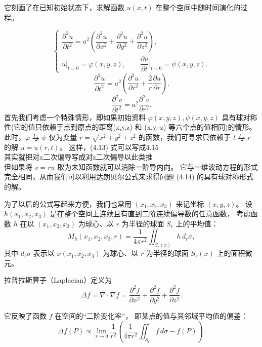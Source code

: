 \begin{solution}
\begin{definition}[柯西问题给t=0的初始时刻条件]
它刻画了在已知初始状态下，求解函数 $u(x,t)$ 在整个空间中随时间演化的过程。
\end{definition}
\begin{dxsolution} \begin{equation}
\begin{cases}
\dfrac{\partial^2 u}{\partial t^2} 
= a^2 \!\left(
\dfrac{\partial^2 u}{\partial x^2} 
+ \dfrac{\partial^2 u}{\partial y^2} 
+ \dfrac{\partial^2 u}{\partial z^2}
\right), \\[10pt]
u\big|_{t=0} = \varphi(x,y,z), \qquad
\dfrac{\partial u}{\partial t}\Big|_{t=0} = \psi(x,y,z).
\end{cases}
\tag{4.14}
\end{equation}
\begin{equation}
\dfrac{\partial^2 u}{\partial t^2}
= a^2 \!\left(
\dfrac{\partial^2 u}{\partial r^2}
+ \dfrac{2}{r} \dfrac{\partial u}{\partial r}
\right).
\tag{4.15}
\end{equation}
\[
\frac{\partial^2 v}{\partial t^2}
= a^2 \frac{\partial^2 v}{\partial r^2}.
\]
\tcblower
首先我们考虑一个特殊情形，即如果初始资料 
$\varphi(x,y,z), \psi(x,y,z)$ 
具有球对称性(它的值只依赖于点到原点的距离(x,y,z) 和 (x,y,-z) 等六个点的值相同)的情形。此时，$\varphi$ 与 $\psi$ 
仅为变量 
$r = \sqrt{x^2 + y^2 + z^2}$ 
的函数，我们可寻求只依赖于 $t$ 与 $r$ 的解 
$u = u(r,t)$。
这样，(4.13) 式可以写成4.15
\\其实就把对x二次偏导写成对z二次偏导以此类推\\
但如果将 $v = r u$ 取为未知函数就可以消除一阶导内向。
它与一维波动方程的形式完全相同，从而我们可以利用达朗贝尔公式来求得问题 (4.14) 的具有球对称形式的解。
\end{dxsolution}
为了以后的公式写起来方便，我们也常用 $(x_1, x_2, x_3)$ 来记坐标 $(x, y, z)$。  
设 $h(x_1, x_2, x_3)$ 是在整个空间上连续且有直到二阶连续偏导数的任意函数，  
考虑函数 $h$ 在以 $(x_1, x_2, x_3)$ 为球心、以 $r$ 为半径的球面 $S_r$ 上的平均值：
\[
M_h(x_1, x_2, x_3, r)
= \frac{1}{4\pi r^2} \iint_{S_r(x)} h\, d_r\sigma,
\tag{4.16}
\]
其中 $d_r\sigma$ 表示以 $x(x_1, x_2, x_3)$ 为球心、以 $r$ 为半径的球面 $S_r(x)$ 上的面积微元。

\begin{definition}
拉普拉斯算子（Laplacian）定义为
\[
\boxed{\Delta f = \nabla \cdot \nabla f
= \frac{\partial^2 f}{\partial x^2}
+ \frac{\partial^2 f}{\partial y^2}
+ \frac{\partial^2 f}{\partial z^2}}.
\]

它反映了函数 $f$ 在空间的“二阶变化率”，
即某点的值与其邻域平均值的偏差：
\[
\Delta f(P)\propto
\lim_{r\to 0}\frac{1}{r^2}\!\left(
\frac{1}{4\pi r^2}\!\iint_{S_r}f\,d\sigma - f(P)
\right).
\]


\end{definition}
\end{solution}
